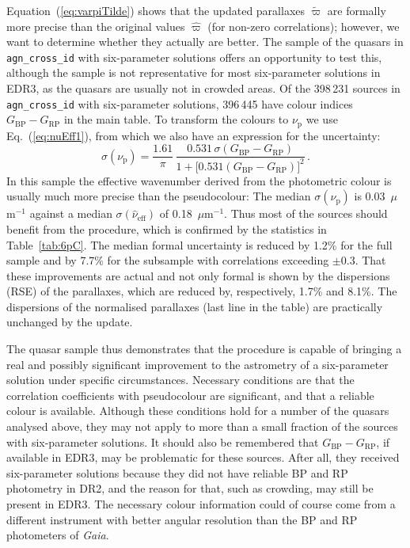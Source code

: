\documentclass[longauth]{aa} %
\newcommand{\gacs}[1]{{\footnotesize\texttt{#1}}}
\begin{document}
Equation~(\ref{eq:varpiTilde}) shows that the updated parallaxes $\widetilde{\varpi}$ are formally 
more precise than the original values $\hat{\varpi}$ (for non-zero correlations); however, we want 
to determine whether they actually are better. The sample of the quasars in 
\gacs{agn\_cross\_id} with six-parameter solutions offers an opportunity to test this, 
although the sample is not representative for most six-parameter solutions in EDR3, 
as the quasars are usually not in crowded areas. Of the 398\,231 
sources in \gacs{agn\_cross\_id} with six-parameter solutions, 396\,445 have colour indices 
$G_\text{BP}-G_\text{RP}$ in the main table. To transform the colours to $\nu_\text{p}$ we use
Eq.~(\ref{eq:nuEff1}), from which we also have an expression for the uncertainty:
\begin{equation}\label{eq:bpRpErr}
\sigma(\nu_\text{p})=\frac{1.61}{\pi}\,\frac{0.531\,\sigma(G_\text{BP}-G_\text{RP})}%
{1+\bigl[0.531(G_\text{BP}-G_\text{RP})\bigr]^2}\, .
\end{equation}
In this sample the effective wavenumber derived from the photometric colour is usually much more 
precise than the pseudocolour: The median $\sigma(\nu_\text{p})$ is 0.03~$\mu$m$^{-1}$ against
a median $\sigma(\hat{\nu}_\text{eff})$ of 0.18~$\mu$m$^{-1}$. Thus most of the sources should
benefit from the procedure, which is confirmed by the statistics in Table~\ref{tab:6pC}. The median
formal uncertainty is reduced by 1.2\% for the full sample and by 7.7\% for the subsample with 
correlations exceeding $\pm 0.3$. That these improvements are actual and not only formal is shown 
by the dispersions (RSE) of the parallaxes, which are reduced by, respectively, 1.7\% and 8.1\%. 
The dispersions of the normalised parallaxes (last line in the table) are practically unchanged
by the update.

The quasar sample thus demonstrates that the procedure is capable of bringing a real and possibly
significant improvement to the astrometry of a six-parameter solution under specific circumstances.
Necessary conditions are that the correlation coefficients with pseudocolour are significant, and that
a reliable colour is available. Although these conditions hold for a number of the quasars analysed above,
they may not apply to more than a small fraction of the sources with six-parameter solutions. 
It should also be remembered that 
$G_\text{BP}-G_\text{RP}$, if available in EDR3, may be problematic for these sources. After all, 
they received six-parameter solutions because they did not have reliable BP and RP photometry in 
DR2, and the reason for that, such as crowding, may still be present in EDR3. The necessary colour 
information could of course come from a different instrument with better angular resolution than 
the BP and RP photometers of \textit{Gaia}.
\end{document}
